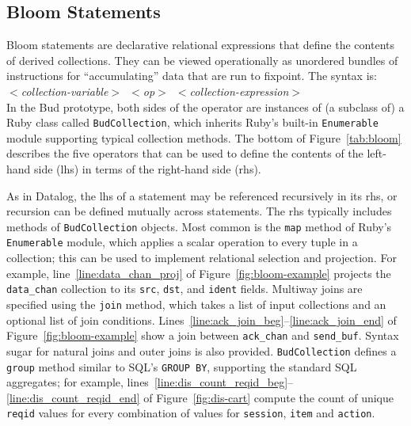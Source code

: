 \subsection{Bloom Statements}
Bloom statements are declarative relational expressions that define the contents
of derived collections.  They can be viewed operationally as unordered bundles
of instructions for ``accumulating'' data that are run to fixpoint.  The syntax
is:\\ \noindent
\mbox{\hspace{0.25in}\emph{$<$collection-variable$>$ $<$op$>$
$<$collection-expression$>$}}\\ \noindent In the Bud prototype, both sides of
the operator are instances of (a subclass of) a Ruby class called
\texttt{BudCollection}, which inherits Ruby's built-in \texttt{Enumerable}
module supporting typical collection methods.  The bottom of Figure~\ref{tab:bloom} describes
the five operators that can be used to define the contents of the left-hand
side (lhs) in terms of the right-hand side (rhs).
\begin{comment}
\jmh{We should probably add a table of BudCollection methods, and a mention of
  it here and in the next paragraph. Could include the commonly-used parts of
  Enumerable like map, reduce, flat\_map, include? and empty?, and some of the
  ones we wrote---group, argagg, argmax, argmin.  And then operations on
  BudCollections, i.e. join and its variants (natjoin, leftjoin).}
\end{comment}

As in Datalog, the lhs of a statement may be referenced recursively in its rhs,
or recursion can be defined mutually across statements.  The rhs typically
includes methods of \texttt{BudCollection} objects.  Most common is the
\texttt{map} method of Ruby's \texttt{Enumerable} module, which applies a scalar
operation to every tuple in a collection; this can be used to implement
relational selection and projection. For example, line~\ref{line:data_chan_proj}
of Figure~\ref{fig:bloom-example} projects the \texttt{data\_chan} collection to
its \texttt{src}, \texttt{dst}, and \texttt{ident} fields.  Multiway joins
are specified using the \texttt{join} method, which takes a list of input
collections and an optional list of join conditions.
Lines~\ref{line:ack_join_beg}--\ref{line:ack_join_end} of
Figure~\ref{fig:bloom-example} show a join between \texttt{ack\_chan} and
\texttt{send\_buf}. Syntax sugar for natural joins and outer joins is also
provided. \texttt{BudCollection} defines a \texttt{group} method similar to
SQL's \texttt{GROUP BY}, supporting the standard SQL aggregates; for example,
lines~\ref{line:dis_count_reqid_beg}--\ref{line:dis_count_reqid_end} of
Figure~\ref{fig:dis-cart} compute the count of unique \texttt{reqid} values for
every combination of values for \texttt{session}, \texttt{item} and
\texttt{action}.

